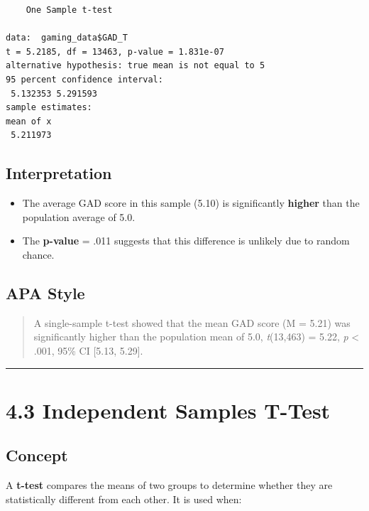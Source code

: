 \documentclass[
]{book}
\providecommand{\tightlist}{%
  \setlength{\itemsep}{0pt}\setlength{\parskip}{0pt}}
\begin{document}
\begin{verbatim}
    One Sample t-test

data:  gaming_data$GAD_T
t = 5.2185, df = 13463, p-value = 1.831e-07
alternative hypothesis: true mean is not equal to 5
95 percent confidence interval:
 5.132353 5.291593
sample estimates:
mean of x 
 5.211973 
\end{verbatim}

\subsection{Interpretation}\label{interpretation-2}

\begin{itemize}
\tightlist
\item
  The average GAD score in this sample (5.10) is significantly \textbf{higher} than the population average of 5.0.
\item
  The \textbf{p-value} = .011 suggests that this difference is unlikely due to random chance.
\end{itemize}

\subsection{APA Style}\label{apa-style-1}

\begin{quote}
A single-sample t-test showed that the mean GAD score (M = 5.21) was significantly higher than the population mean of 5.0, \emph{t}(13,463) = 5.22, \emph{p} \textless{} .001, 95\% CI {[}5.13, 5.29{]}.
\end{quote}

\begin{center}\rule{0.5\linewidth}{0.5pt}\end{center}

\section{4.3 Independent Samples T-Test}\label{independent-samples-t-test}

\subsection{Concept}\label{concept-2}

A \textbf{t-test} compares the means of two groups to determine whether they are statistically different from each other. It is used when:
\end{document}
